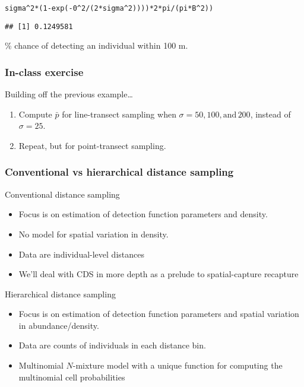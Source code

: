 \documentclass[color=usenames,dvipsnames]{beamer}\usepackage[]{graphicx}\usepackage[]{color}
\makeatletter
\newcommand{\hlnum}[1]{\textcolor[rgb]{0.69,0.494,0}{#1}}%
\newcommand{\hlopt}[1]{\textcolor[rgb]{0,0,0}{#1}}%
\newcommand{\hlstd}[1]{\textcolor[rgb]{0,0,0}{#1}}%
\newcommand{\hlkwd}[1]{\textcolor[rgb]{0.004,0.004,0.506}{#1}}%
\newenvironment{kframe}{%
 \def\at@end@of@kframe{}%
 \ifinner\ifhmode%
  \def\at@end@of@kframe{\end{minipage}}%
  \begin{minipage}{\columnwidth}%
 \fi\fi%
 \def\FrameCommand##1{\hskip\@totalleftmargin \hskip-\fboxsep
 \colorbox{shadecolor}{##1}\hskip-\fboxsep
     \hskip-\linewidth \hskip-\@totalleftmargin \hskip\columnwidth}%
 \MakeFramed {\advance\hsize-\width
   \@totalleftmargin\z@ \linewidth\hsize
   \@setminipage}}%
 {\par\unskip\endMakeFramed%
 \at@end@of@kframe}
\newenvironment{knitrout}{}{} %
\makeatother
\begin{document}
\begin{frame}[fragile]
\begin{knitrout}
\begin{kframe}
\begin{alltt}
          \hlstd{sigma}\hlopt{^}\hlnum{2}\hlopt{*}\hlstd{(}\hlnum{1}\hlopt{-}\hlkwd{exp}\hlstd{(}\hlopt{-}\hlnum{0}\hlopt{^}\hlnum{2}\hlopt{/}\hlstd{(}\hlnum{2}\hlopt{*}\hlstd{sigma}\hlopt{^}\hlnum{2}\hlstd{))))} \hlopt{*} \hlnum{2}\hlopt{*}\hlstd{pi}\hlopt{/}\hlstd{(pi}\hlopt{*}\hlstd{B}\hlopt{^}\hlnum{2}\hlstd{))}
\end{alltt}
\begin{verbatim}
## [1] 0.1249581
\end{verbatim}
\end{kframe}
\end{knitrout}
\pause
\vfill
{}\% chance of detecting an individual within 100 m. \\
\end{frame}





\begin{frame}
  \frametitle{In-class exercise}
  Building off the previous example\dots
  \begin{enumerate}
    \item Compute $\bar{p}$ for line-transect sampling when
      $\sigma=50, 100, \mathrm{and}\, 200$, instead of $\sigma=25$.  
    \item Repeat, but for point-transect sampling. 
  \end{enumerate}
\end{frame}




\begin{frame}
  \frametitle{\large Conventional vs hierarchical distance sampling}
  \alert{Conventional} distance sampling
  \begin{itemize}
    \item Focus is on estimation of detection function parameters and density.
    \item No model for spatial variation in density.
    \item Data are individual-level distances
    \item We'll deal with CDS in more depth as a prelude to
      spatial-capture recapture
  \end{itemize}
  \pause
  \vfill
  \alert{Hierarchical} distance sampling
  \begin{itemize}
    \item Focus is on estimation of detection function parameters and
      spatial variation in abundance/density.
    \item Data are counts of individuals in each distance bin.
    \item Multinomial $N$-mixture model with a unique function for
      computing the multinomial cell probabilities 
  \end{itemize}
\end{frame}
\end{document}
